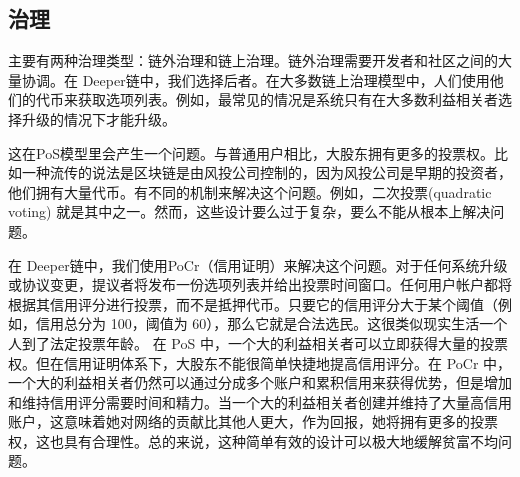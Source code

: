 \documentclass[a4paper]{article}
\begin{document}





\subsection{治理}
主要有两种治理类型：链外治理和链上治理。链外治理需要开发者和社区之间的大量协调。在 Deeper链中，我们选择后者。在大多数链上治理模型中，人们使用他们的代币来获取选项列表。例如，最常见的情况是系统只有在大多数利益相关者选择升级的情况下才能升级。

这在PoS模型里会产生一个问题。与普通用户相比，大股东拥有更多的投票权。比如一种流传的说法是区块链是由风投公司控制的，因为风投公司是早期的投资者，他们拥有大量代币。有不同的机制来解决这个问题。例如，二次投票(quadratic voting) 就是其中之一。然而，这些设计要么过于复杂，要么不能从根本上解决问题。

在 Deeper链中，我们使用PoCr（信用证明）来解决这个问题。对于任何系统升级或协议变更，提议者将发布一份选项列表并给出投票时间窗口。任何用户帐户都将根据其信用评分进行投票，而不是抵押代币。只要它的信用评分大于某个阈值（例如，信用总分为
100，阈值为 60），那么它就是合法选民。这很类似现实生活一个人到了法定投票年龄。
在 PoS 中，一个大的利益相关者可以立即获得大量的投票权。但在信用证明体系下，大股东不能很简单快捷地提高信用评分。在 PoCr 中，一个大的利益相关者仍然可以通过分成多个账户和累积信用来获得优势，但是增加和维持信用评分需要时间和精力。当一个大的利益相关者创建并维持了大量高信用账户，这意味着她对网络的贡献比其他人更大，作为回报，她将拥有更多的投票权，这也具有合理性。总的来说，这种简单有效的设计可以极大地缓解贫富不均问题。
\end{document}
